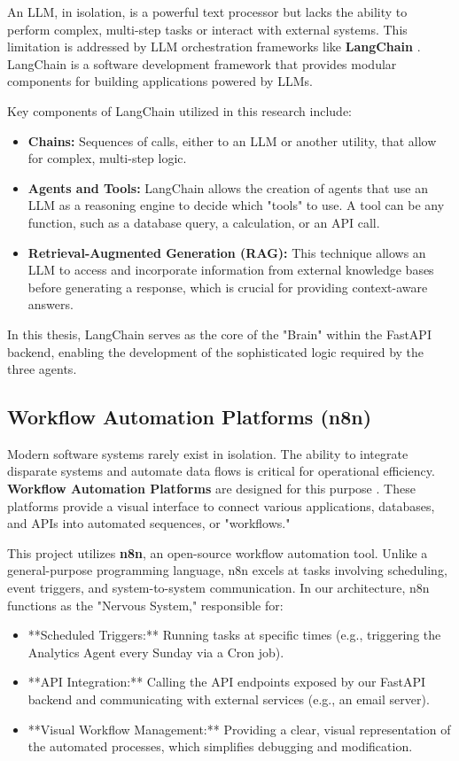 An LLM, in isolation, is a powerful text processor but lacks the ability to perform complex, multi-step tasks or interact with external systems. This limitation is addressed by LLM orchestration frameworks like \textbf{LangChain} \cite{FIND_CITATION_PLEASE}. LangChain is a software development framework that provides modular components for building applications powered by LLMs.

Key components of LangChain utilized in this research include:
\begin{itemize}
    \item \textbf{Chains:} Sequences of calls, either to an LLM or another utility, that allow for complex, multi-step logic.
    \item \textbf{Agents and Tools:} LangChain allows the creation of agents that use an LLM as a reasoning engine to decide which "tools" to use. A tool can be any function, such as a database query, a calculation, or an API call.
    \item \textbf{Retrieval-Augmented Generation (RAG):} This technique allows an LLM to access and incorporate information from external knowledge bases before generating a response, which is crucial for providing context-aware answers.
\end{itemize}
In this thesis, LangChain serves as the core of the "Brain" within the FastAPI backend, enabling the development of the sophisticated logic required by the three agents.

\subsection{Workflow Automation Platforms (n8n)}
\label{subsec:n8n}

Modern software systems rarely exist in isolation. The ability to integrate disparate systems and automate data flows is critical for operational efficiency. \textbf{Workflow Automation Platforms} are designed for this purpose \cite{FIND_CITATION_PLEASE}. These platforms provide a visual interface to connect various applications, databases, and APIs into automated sequences, or "workflows."

This project utilizes \textbf{n8n}, an open-source workflow automation tool. Unlike a general-purpose programming language, n8n excels at tasks involving scheduling, event triggers, and system-to-system communication. In our architecture, n8n functions as the "Nervous System," responsible for:
\begin{itemize}
    \item **Scheduled Triggers:** Running tasks at specific times (e.g., triggering the Analytics Agent every Sunday via a Cron job).
    \item **API Integration:** Calling the API endpoints exposed by our FastAPI backend and communicating with external services (e.g., an email server).
    \item **Visual Workflow Management:** Providing a clear, visual representation of the automated processes, which simplifies debugging and modification.
\end{itemize}


